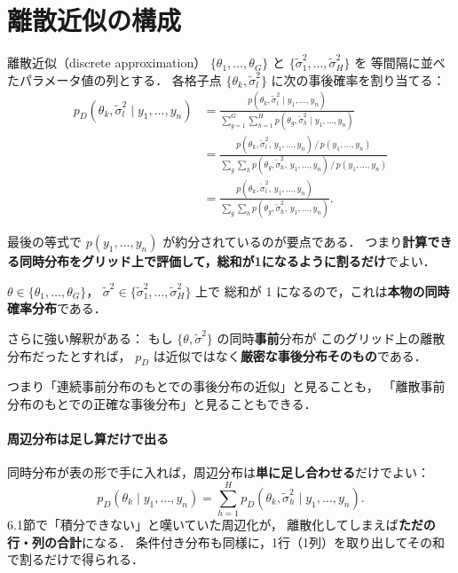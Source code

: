 \documentclass[lualatex,ja=standard,a4paper,12pt]{bxjsarticle}
\begin{document}
\section{離散近似の構成}

\begin{defbox}{離散近似（discrete approximation）}
$\{\theta_1, \ldots, \theta_G\}$ と $\{\tilde{\sigma}_1^2, \ldots, \tilde{\sigma}_H^2\}$ を
等間隔に並べたパラメータ値の列とする．
各格子点 $\{\theta_k, \tilde{\sigma}_l^2\}$ に次の事後確率を割り当てる：
\begin{align*}
  p_D(\theta_k, \tilde{\sigma}_l^2 \mid y_1, \ldots, y_n)
  &= \frac{p(\theta_k, \tilde{\sigma}_l^2 \mid y_1, \ldots, y_n)}
          {\sum_{g=1}^{G}\sum_{h=1}^{H} p(\theta_g, \tilde{\sigma}_h^2 \mid y_1, \ldots, y_n)} \\[6pt]
  &= \frac{p(\theta_k, \tilde{\sigma}_l^2,\, y_1, \ldots, y_n) \,/\, p(y_1, \ldots, y_n)}
          {\sum_{g}\sum_{h} p(\theta_g, \tilde{\sigma}_h^2,\, y_1, \ldots, y_n) \,/\, p(y_1, \ldots, y_n)} \\[6pt]
  &= \frac{p(\theta_k, \tilde{\sigma}_l^2,\, y_1, \ldots, y_n)}
          {\sum_{g}\sum_{h} p(\theta_g, \tilde{\sigma}_h^2,\, y_1, \ldots, y_n)}.
\end{align*}
\end{defbox}

\noindent 最後の等式で $p(y_1,\ldots,y_n)$ が約分されているのが要点である．
つまり\textbf{計算できる同時分布をグリッド上で評価して，総和が1になるように割るだけ}でよい．

\medskip
$\theta \in \{\theta_1, \ldots, \theta_G\}$，
$\tilde{\sigma}^2 \in \{\tilde{\sigma}_1^2, \ldots, \tilde{\sigma}_H^2\}$ 上で
総和が 1 になるので，これは\textbf{本物の同時確率分布}である．

\begin{pointbox}
さらに強い解釈がある：
もし $\{\theta, \tilde{\sigma}^2\}$ の同時\textbf{事前}分布が
このグリッド上の離散分布だったとすれば，
$p_D$ は近似ではなく\textbf{厳密な事後分布そのもの}である．

\medskip
つまり「連続事前分布のもとでの事後分布の近似」と見ることも，
「離散事前分布のもとでの正確な事後分布」と見ることもできる．
\end{pointbox}

\paragraph{周辺分布は足し算だけで出る}
同時分布が表の形で手に入れば，周辺分布は\textbf{単に足し合わせる}だけでよい：
\[
  p_D(\theta_k \mid y_1, \ldots, y_n)
  = \sum_{h=1}^{H} p_D(\theta_k, \tilde{\sigma}_h^2 \mid y_1, \ldots, y_n).
\]
6.1節で「積分できない」と嘆いていた周辺化が，
離散化してしまえば\textbf{ただの行・列の合計}になる．
条件付き分布も同様に，1行（1列）を取り出してその和で割るだけで得られる．
\end{document}
